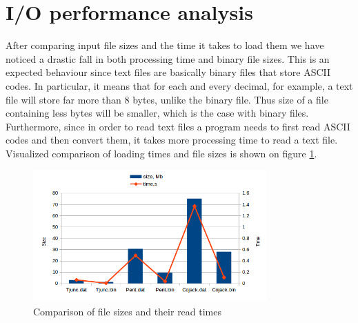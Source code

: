 \documentclass{article}
\begin{document}
\section{I/O performance analysis}
After comparing input file sizes and the time it takes to load them we have noticed a drastic fall in both processing time and binary file sizes. This is an expected behaviour since text files are basically binary files that store ASCII codes. In particular, it means that for each and every decimal, for example, a text file will store far more than 8 bytes, unlike the binary file. Thus size of a file containing less bytes will be smaller, which is the case with binary files. Furthermore, since in order to read text files a program needs to first read ASCII codes and then convert them, it takes more processing time to read a text file. Visualized comparison of loading times and file sizes is shown on figure \ref{fig:3}.

\begin{figure}[h]
\begin{center}
\includegraphics[width=0.8\textwidth]{time-size} %
\caption{Comparison of file sizes and their read times}
\label{fig:3}
\end{center}
\end{figure}
\end{document}
